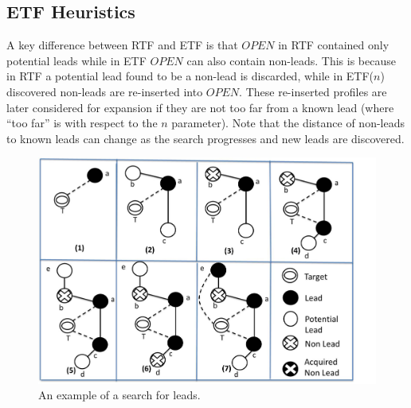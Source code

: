 \documentclass[journal]{IEEEtran}
\begin{document}
\subsection{ETF Heuristics}
A key difference between RTF and ETF is that $OPEN$ in RTF contained only potential leads while in ETF $OPEN$ can also contain non-leads. This is because in RTF a potential lead found to be a non-lead is discarded, while in ETF($n$) discovered non-leads are re-inserted into $OPEN$. These re-inserted profiles are later considered for expansion if they are not too far from a known lead (where ``too far'' is with respect to the $n$ parameter). %
Note that the distance of non-leads to known leads can change as the search progresses and new leads are discovered.

\begin{figure}[t!]

  \centering
	 \includegraphics[width=0.75\linewidth]{process-and-legend-new.jpg}
  \caption{An example of a search for leads.}\label{fig:etf_process-and-legend}
\end{figure}
\end{document}
